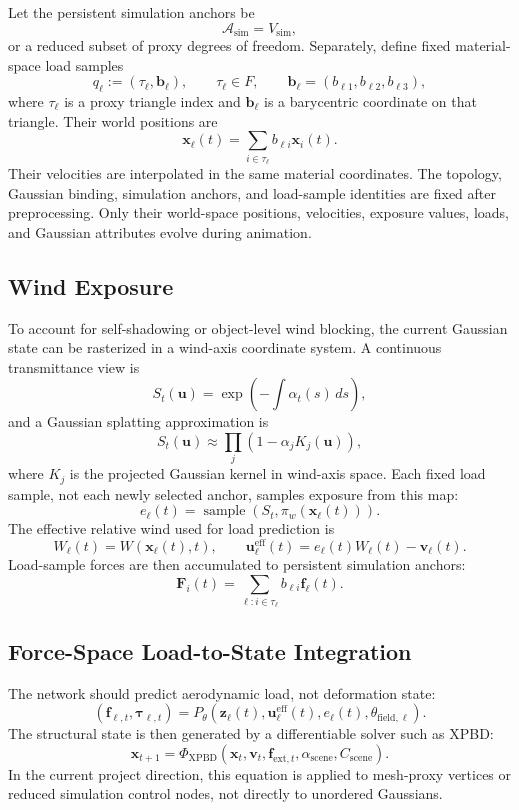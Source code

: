 \documentclass[11pt]{article}
\begin{document}
Let the persistent simulation anchors be
\[
  \mathcal{A}_{\mathrm{sim}} = V_{\mathrm{sim}},
\]
or a reduced subset of proxy degrees of freedom. Separately, define fixed material-space load samples
\[
  q_\ell := (\tau_\ell,\mathbf{b}_\ell),
  \qquad
  \tau_\ell\in F,
  \qquad
  \mathbf{b}_\ell=(b_{\ell 1},b_{\ell 2},b_{\ell 3}),
\]
where \(\tau_\ell\) is a proxy triangle index and \(\mathbf{b}_\ell\) is a barycentric coordinate on that triangle. Their world positions are
\[
  \mathbf{x}_\ell(t)
  =
  \sum_{i\in \tau_\ell} b_{\ell i}\mathbf{x}_i(t).
\]
Their velocities are interpolated in the same material coordinates.
The topology, Gaussian binding, simulation anchors, and load-sample identities are fixed after preprocessing. Only their world-space positions, velocities, exposure values, loads, and Gaussian attributes evolve during animation.

\subsection{Wind Exposure}

To account for self-shadowing or object-level wind blocking, the current Gaussian state can be rasterized in a wind-axis coordinate system. A continuous transmittance view is
\[
  S_t(\mathbf{u})
  =
  \exp\left(-\int \alpha_t(s)\,ds\right),
\]
and a Gaussian splatting approximation is
\[
  S_t(\mathbf{u})
  \approx
  \prod_j \left(1-\alpha_j K_j(\mathbf{u})\right),
\]
where \(K_j\) is the projected Gaussian kernel in wind-axis space. Each fixed load sample, not each newly selected anchor, samples exposure from this map:
\[
  e_\ell(t)=\operatorname{sample}\left(S_t,\pi_w(\mathbf{x}_\ell(t))\right).
\]
The effective relative wind used for load prediction is
\[
  W_\ell(t)=W(\mathbf{x}_\ell(t),t),
  \qquad
  \mathbf{u}^{\mathrm{eff}}_\ell(t)=e_\ell(t)W_\ell(t)-\mathbf{v}_\ell(t).
\]
Load-sample forces are then accumulated to persistent simulation anchors:
\[
  \mathbf{F}_i(t)
  =
  \sum_{\ell:i\in \tau_\ell}
  b_{\ell i}\mathbf{f}_\ell(t).
\]

\subsection{Force-Space Load-to-State Integration}

The network should predict aerodynamic load, not deformation state:
\[
  (\mathbf{f}_{\ell,t},\boldsymbol{\tau}_{\ell,t})
  =
  P_\theta\left(\mathbf{z}_\ell(t),
  \mathbf{u}^{\mathrm{eff}}_\ell(t),
  e_\ell(t),
  \theta_{\mathrm{field},\ell}\right).
\]
The structural state is then generated by a differentiable solver such as XPBD:
\[
  \mathbf{x}_{t+1}
  =
  \Phi_{\mathrm{XPBD}}
  \left(
    \mathbf{x}_t,
    \mathbf{v}_t,
    \mathbf{f}_{\mathrm{ext},t},
    \alpha_{\mathrm{scene}},
    C_{\mathrm{scene}}
  \right).
\]
In the current project direction, this equation is applied to mesh-proxy vertices or reduced simulation control nodes, not directly to unordered Gaussians.
\end{document}
